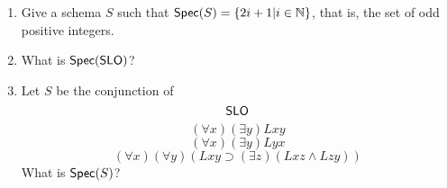 \begin{mdframed}[linewidth=1]
\begin{enumerate}
   \item Give a schema $S$ such that $\mbox{$\mathsf{Spec}(S)$} = \{2i + 1 | i \in \mathbb{N}\}$, that is, the set of odd positive integers. 

   \item What is $\mbox{$\mathsf{Spec}(\mbox{$\mathsf{SLO}$})$}$?

   \item Let $S$ be the conjunction of 
   \[
       \mbox{$\mathsf{SLO}$}
   \]
   \[
       (\forall x) (\exists y) Lxy
   \]
   \[
       (\forall x) (\exists y) Lyx
   \]
   \[
       (\forall x)(\forall y)(Lxy \supset (\exists z)(Lxz \land Lzy))
   \]
   What is $\spec{S}$?
\iffalse
   \item Let $S$ be the conjunction of
   \[
       (\forall x)((\forall y) \lnot Lxy \vee (\exists y)(\exists z)(y \neq z \land (\forall u)(Lxu \equiv (u = y \vee u = z))))
   \]
   \[
       (\forall x)(\forall y)(Lxy \supset \lnot Lyx)
   \]
   \[
       (\exists x)((\forall y) \lnot Lyx \land (\forall y)(y \neq x \supset (\exists u)(\forall w)(Lwy \equiv u = w)))
   \]
   What is $\spec{S}$?
\fi
\end{enumerate}
\end{mdframed}

